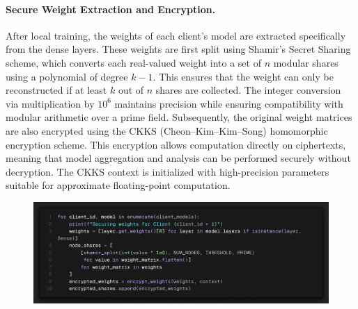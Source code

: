 \documentclass[10pt]{article}
\begin{document}
\paragraph{Secure Weight Extraction and Encryption.}
After local training, the weights of each client's model are extracted specifically from the dense layers. These weights are first split using Shamir’s Secret Sharing scheme, which converts each real-valued weight into a set of $n$ modular shares using a polynomial of degree $k - 1$. This ensures that the weight can only be reconstructed if at least $k$ out of $n$ shares are collected. The integer conversion via multiplication by $10^6$ maintains precision while ensuring compatibility with modular arithmetic over a prime field.
Subsequently, the original weight matrices are also encrypted using the CKKS (Cheon–Kim–Kim–Song) homomorphic encryption scheme. This encryption allows computation directly on ciphertexts, meaning that model aggregation and analysis can be performed securely without decryption. The CKKS context is initialized with high-precision parameters suitable for approximate floating-point computation.
\begin{figure}[H]
	\centering
	\includegraphics[height = 0.2\textheight]{img/QFL_code/7.png}
\end{figure}
\end{document}
